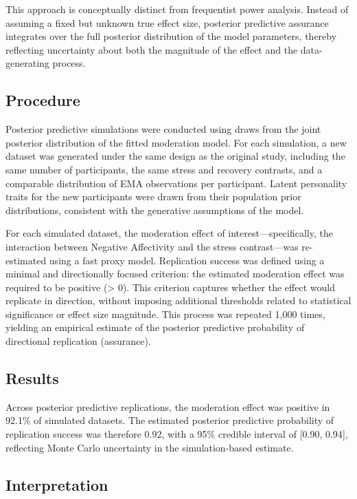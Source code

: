 \documentclass[
  english,
  man,floatsintext]{apa6}
\begin{document}
This approach is conceptually distinct from frequentist power analysis. Instead of assuming a fixed but unknown true effect size, posterior predictive assurance integrates over the full posterior distribution of the model parameters, thereby reflecting uncertainty about both the magnitude of the effect and the data-generating process.

\subsection{Procedure}\label{procedure}

Posterior predictive simulations were conducted using draws from the joint posterior distribution of the fitted moderation model. For each simulation, a new dataset was generated under the same design as the original study, including the same number of participants, the same stress and recovery contrasts, and a comparable distribution of EMA observations per participant. Latent personality traits for the new participants were drawn from their population prior distributions, consistent with the generative assumptions of the model.

For each simulated dataset, the moderation effect of interest---specifically, the interaction between Negative Affectivity and the stress contrast---was re-estimated using a fast proxy model. Replication success was defined using a minimal and directionally focused criterion: the estimated moderation effect was required to be positive (\textgreater{} 0). This criterion captures whether the effect would replicate in direction, without imposing additional thresholds related to statistical significance or effect size magnitude. This process was repeated 1,000 times, yielding an empirical estimate of the posterior predictive probability of directional replication (assurance).

\subsection{Results}\label{results-2}

Across posterior predictive replications, the moderation effect was positive in 92.1\% of simulated datasets. The estimated posterior predictive probability of replication success was therefore 0.92, with a 95\% credible interval of {[}0.90, 0.94{]}, reflecting Monte Carlo uncertainty in the simulation-based estimate.

\subsection{Interpretation}\label{interpretation-2}
\end{document}
